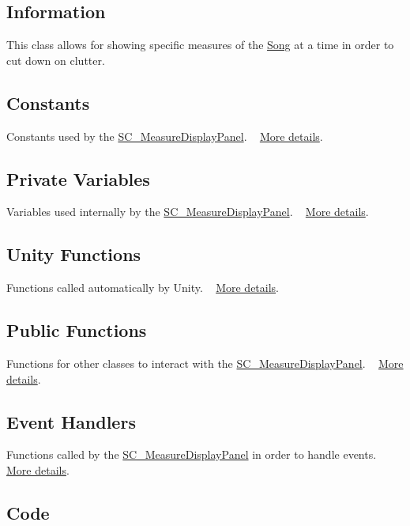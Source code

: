 \hypertarget{group___doc_s_c___m_d_p_DocSC_MDPInfo}{}\subsection{Information}\label{group___doc_s_c___m_d_p_DocSC_MDPInfo}
This class allows for showing specific measures of the \hyperlink{class_song}{Song} at a time in order to cut down on clutter.\hypertarget{group___doc_s_c___m_d_p_DocSC_MDPConst}{}\subsection{Constants}\label{group___doc_s_c___m_d_p_DocSC_MDPConst}
Constants used by the \hyperlink{class_s_c___measure_display_panel}{S\+C\+\_\+\+Measure\+Display\+Panel}. ~\newline
 \hyperlink{group___s_c___m_d_p_const}{More details}.\hypertarget{group___doc_s_c___m_d_p_DocSC_MDPPrivVar}{}\subsection{Private Variables}\label{group___doc_s_c___m_d_p_DocSC_MDPPrivVar}
Variables used internally by the \hyperlink{class_s_c___measure_display_panel}{S\+C\+\_\+\+Measure\+Display\+Panel}. ~\newline
 \hyperlink{group___s_c___m_d_p_priv_var}{More details}.\hypertarget{group___doc_s_c___m_d_p_DocSC_MDPUnity}{}\subsection{Unity Functions}\label{group___doc_s_c___m_d_p_DocSC_MDPUnity}
Functions called automatically by Unity. ~\newline
 \hyperlink{group___s_c___m_d_p_unity}{More details}.\hypertarget{group___doc_s_c___m_d_p_DocSC_MDPPubFunc}{}\subsection{Public Functions}\label{group___doc_s_c___m_d_p_DocSC_MDPPubFunc}
Functions for other classes to interact with the \hyperlink{class_s_c___measure_display_panel}{S\+C\+\_\+\+Measure\+Display\+Panel}. ~\newline
 \hyperlink{group___s_c___m_d_p_pub_func}{More details}.\hypertarget{group___doc_s_c___m_d_p_DocSC_MDPHandlers}{}\subsection{Event Handlers}\label{group___doc_s_c___m_d_p_DocSC_MDPHandlers}
Functions called by the \hyperlink{class_s_c___measure_display_panel}{S\+C\+\_\+\+Measure\+Display\+Panel} in order to handle events. ~\newline
 \hyperlink{group___s_c___m_d_p_handlers}{More details}.\hypertarget{group___doc_s_c___m_d_p_DocSC_MDPCode}{}\subsection{Code}\label{group___doc_s_c___m_d_p_DocSC_MDPCode}

